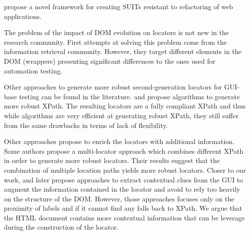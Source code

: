 \cite{Pirzadeh2014} propose a novel framework for creating SUITs resistant to refactoring of web applications.

The problem of the impact of DOM evolution on locators is not new in the research community. First attempts at solving this problem come from the information retrieval community\cite{Anton2005, Dalvi2009, Cohen2015}. However, they target different elements in the DOM (wrappers) presenting significant differences to the ones used for automation testing.

Other approaches to generate more robust second-generation locators for GUI-base testing can be found in the literature. \textcite{Leotta2014, Leotta2016} and \textcite{Montoto2011} propose algorithms to generate more robust XPath. The resulting locators are a fully compliant XPath and thus while algorithms are very efficient at generating robust XPath, they still suffer from the same drawbacks in terms of lack of flexibility. 

Other approaches propose to enrich the locators with additional information. Some authors\cite{Leotta2015, Zheng2018} propose a multi-locator approach which combines different XPath in order to generate more robust locators. Their results suggest that the combination of multiple location paths yields more robust locators. Closer to our work, \textcite{Thummalapenta2013} and later \textcite{Yandrapally2014} propose approaches to extract contextual clues from the GUI to augment the information contained in the locator and avoid to rely too heavily on the structure of the DOM. However, those approaches focuses only on the proximity of labels and if it cannot find any falls back to XPath. We argue that the HTML document contains more contextual information that can be leverage during the construction of the locator.